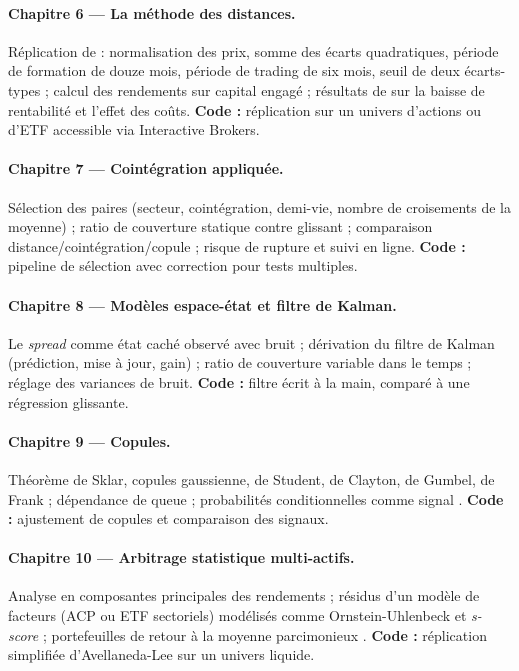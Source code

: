 \paragraph{Chapitre 6 — La méthode des distances.}
Réplication de \citet{gatev2006} : normalisation des prix, somme des écarts quadratiques, période de formation de douze mois, période de trading de six mois, seuil de deux écarts-types ; calcul des rendements sur capital engagé ; résultats de \citet{dofaff2010,dofaff2012} sur la baisse de rentabilité et l'effet des coûts. \textbf{Code :} réplication sur un univers d'actions ou d'ETF accessible via Interactive Brokers.

\paragraph{Chapitre 7 — Cointégration appliquée.}
Sélection des paires (secteur, cointégration, demi-vie, nombre de croisements de la moyenne) \citep{vidyamurthy2004,huck2009} ; ratio de couverture statique contre glissant ; comparaison distance/cointégration/copule \citep{rad2016} ; risque de rupture et suivi en ligne. \textbf{Code :} pipeline de sélection avec correction pour tests multiples.

\paragraph{Chapitre 8 — Modèles espace-état et filtre de Kalman.}
Le \emph{spread} comme état caché observé avec bruit \citep{elliott2005} ; dérivation du filtre de Kalman (prédiction, mise à jour, gain) ; ratio de couverture variable dans le temps ; réglage des variances de bruit. \textbf{Code :} filtre écrit à la main, comparé à une régression glissante.

\paragraph{Chapitre 9 — Copules.}
Théorème de Sklar, copules gaussienne, de Student, de Clayton, de Gumbel, de Frank ; dépendance de queue ; probabilités conditionnelles comme signal \citep{liewwu2013,xie2016}. \textbf{Code :} ajustement de copules et comparaison des signaux.

\paragraph{Chapitre 10 — Arbitrage statistique multi-actifs.}
Analyse en composantes principales des rendements ; résidus d'un modèle de facteurs (ACP ou ETF sectoriels) modélisés comme Ornstein-Uhlenbeck et \emph{s-score} \citep{avellaneda2010} ; portefeuilles de retour à la moyenne parcimonieux \citep{boxtiao1977,daspremont2011}. \textbf{Code :} réplication simplifiée d'Avellaneda-Lee sur un univers liquide.

